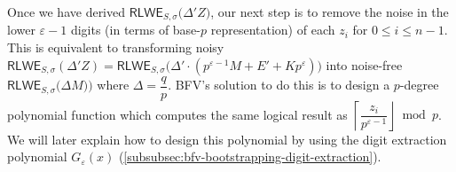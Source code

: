 Once we have derived $\textsf{RLWE}_{S, \sigma}\bm(\Delta' Z\bm)$, our next step is to remove the noise in the lower $\varepsilon-1$ digits (in terms of base-$p$ representation) of each $z_i$ for $0 \leq i \leq n - 1$. This is equivalent to transforming noisy $\textsf{RLWE}_{S, \sigma}(\Delta' Z) = \textsf{RLWE}_{S, \sigma}\bm(\Delta' \cdot (p^{\varepsilon-1} M  + E' + Kp^\varepsilon)\bm)$ into noise-free $\textsf{RLWE}_{S, \sigma}\bm (\Delta M)\bm )$ where $\Delta = \dfrac{q}{p}$. BFV's solution to do this is to design a $p$-degree polynomial function which computes the same logical result as $\left\lceil \dfrac{z_i}{p^{\varepsilon-1}} \right\rfloor \bmod p$. We will later explain how to design this polynomial by using the digit extraction polynomial $G_\varepsilon(x)$ (\autoref{subsubsec:bfv-bootstrapping-digit-extraction}). 




